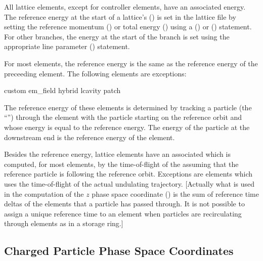 All lattice elements, except for controller elements, have an
associated  energy.  The reference energy at the
start of a lattice's  () is set in
the lattice file by setting the reference momentum () or total
energy () using a  () or
 () statement. For other branches, the
energy at the start of the branch is set using the appropriate line
parameter () statement.

For most elements, the reference energy is the same as the reference
energy of the preceeding element. The following elements are
exceptions:
\begin{example}
  custom
  em_field
  hybrid
  lcavity
  patch
\end{example}
The reference energy of these elements is determined by tracking a
particle (the ``'') through the element with the
particle starting on the reference orbit and whose energy is equal to
the reference energy.  The energy of the particle at the downstream
end is the reference energy of the element.

Besides the reference energy, lattice elements have an associated
 which is computed, for most elements, by the
time-of-flight of the  assuming that the
reference particle is following the reference orbit. Exceptions are
 elements which uses the time-of-flight of the actual
undulating trajectory. [Actually what is used in the computation of the
$z$ phase space coordinate () is the sum of reference time
deltas of the elements that a particle has passed through. It is not
possible to assign a unique reference time to an element when particles
are recirculating through elements as in a storage ring.]

\subsection{Charged Particle Phase Space Coordinates}
\label{s:phase.space}

